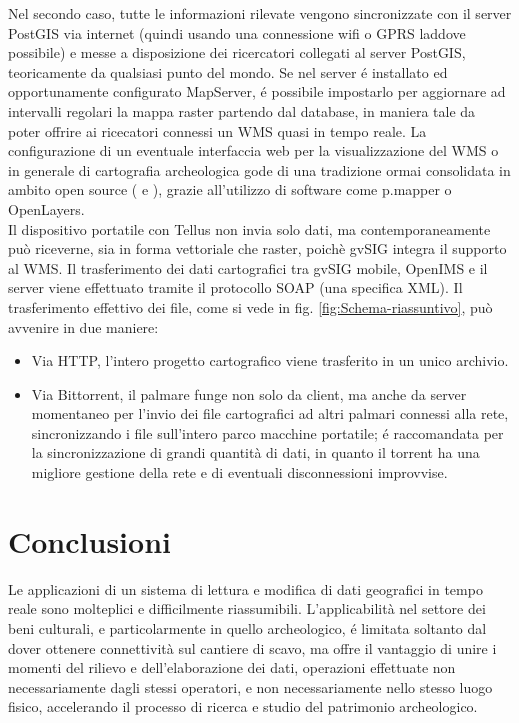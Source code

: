 \documentclass{paper}
\begin{document}
	Nel secondo caso, tutte le informazioni rilevate vengono sincronizzate
	con il server PostGIS via internet (quindi usando una connessione
	wifi o GPRS laddove possibile) e messe a disposizione dei ricercatori
	collegati al server PostGIS, teoricamente da qualsiasi punto del mondo.
	Se nel server \'{e} installato ed opportunamente configurato MapServer,
	\'{e} possibile impostarlo per aggiornare ad intervalli regolari la mappa
	raster partendo dal database, in maniera tale da poter offrire ai
	ricecatori connessi un WMS quasi in tempo reale. La configurazione
	di un eventuale interfaccia web per la visualizzazione del WMS o in
	generale di cartografia archeologica gode di una tradizione ormai
	consolidata in ambito open source (\cite{geoportali-archeologia} e \cite{webmapping-arch}),
	grazie all'utilizzo di software come p.mapper o OpenLayers.\\

	Il dispositivo portatile con Tellus non invia solo dati, ma contemporaneamente
	pu\`{o} riceverne, sia in forma vettoriale che raster, poichè gvSIG integra
	il supporto al WMS. Il trasferimento dei dati cartografici tra gvSIG
	mobile, OpenIMS e il server viene effettuato tramite il protocollo
	SOAP (una specifica XML). Il trasferimento effettivo dei file, come si vede in
	fig. \ref{fig:Schema-riassuntivo}, pu\`{o} avvenire in due maniere:
	
	\begin{itemize}
		\item Via HTTP, l'intero progetto cartografico viene trasferito in un unico
			archivio.
		\item Via Bittorrent, il palmare funge non solo da client, ma anche da server
			momentaneo per l'invio dei file cartografici ad altri palmari connessi
			alla rete, sincronizzando i file sull'intero parco macchine portatile;
			\'{e} raccomandata per la sincronizzazione di grandi quantità di dati,
			in quanto il torrent ha una migliore gestione della rete e di eventuali
			disconnessioni improvvise.
	\end{itemize}


\section{Conclusioni}

	Le applicazioni di un sistema di lettura e modifica di dati geografici
	in tempo reale sono molteplici e difficilmente riassumibili. L'applicabilità
	nel settore dei beni culturali, e particolarmente in quello archeologico,
	\'{e} limitata soltanto dal dover ottenere connettivit\`{a} sul cantiere di
	scavo, ma offre il vantaggio di unire i momenti del rilievo e dell'elaborazione
	dei dati, operazioni effettuate non necessariamente dagli stessi operatori,
	e non necessariamente nello stesso luogo fisico, accelerando il processo
	di ricerca e studio del patrimonio archeologico.
\end{document}
